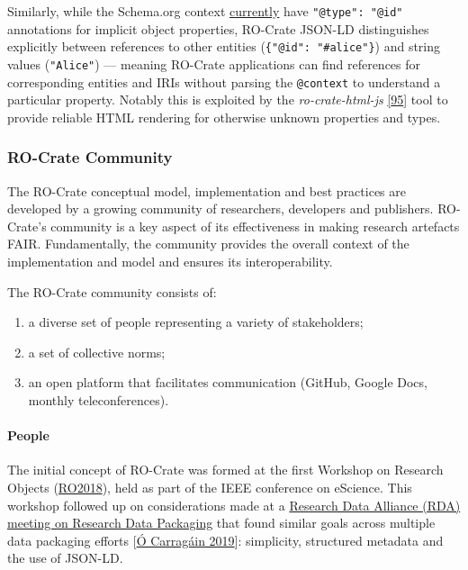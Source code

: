 Similarly, while the Schema.org context
\href{https://schema.org/version/13.0/schemaorg-current-http.jsonld}{currently}
have \texttt{"@type":\ "@id"} annotations for implicit object
properties, RO-Crate JSON-LD distinguishes explicitly between references
to other entities (\texttt{\{"@id":\ "\#alice"\}}) and string values
(\texttt{"Alice"}) --- meaning RO-Crate applications can find references
for corresponding entities and IRIs without parsing the
\texttt{@context} to understand a particular property. Notably this is
exploited by the \emph{ro-crate-html-js}
\href{https://www.npmjs.com/package/ro-crate-html-js}{{[}95{]}} tool to
provide reliable HTML rendering for otherwise unknown properties and
types.

\hypertarget{community}{%
\subsubsection{RO-Crate Community}\label{community}}

The RO-Crate conceptual model, implementation and best practices are
developed by a growing community of researchers, developers and
publishers. RO-Crate's community is a key aspect of its effectiveness in
making research artefacts FAIR. Fundamentally, the community provides
the overall context of the implementation and model and ensures its
interoperability.

The RO-Crate community consists of:

\begin{enumerate}
\def\labelenumi{\arabic{enumi}.}
\tightlist
\item
  a diverse set of people representing a variety of stakeholders;
\item
  a set of collective norms;
\item
  an open platform that facilitates communication (GitHub, Google Docs,
  monthly teleconferences).
\end{enumerate}

\hypertarget{people}{%
\paragraph{People}\label{people}}

The initial concept of RO-Crate was formed at the first Workshop on
Research Objects
(\href{https://www.researchobject.org/ro2018/}{RO2018}), held as part of
the IEEE conference on eScience. This workshop followed up on
considerations made at a
\href{https://rd-alliance.org/approaches-research-data-packaging-rda-11th-plenary-bof-meeting}{Research
Data Alliance (RDA) meeting on Research Data Packaging} that found
similar goals across multiple data packaging efforts
{[}\href{https://doi.org/10.5281/zenodo.3250687}{Ó Carragáin 2019}{]}: simplicity,
structured metadata and the use of JSON-LD.

